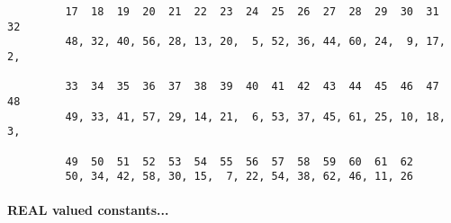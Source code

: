 \begin{itemize}
\begin{minipage}[t]{\textwidth}
\begin{verbatim}
         17  18  19  20  21  22  23  24  25  26  27  28  29  30  31  32
         48, 32, 40, 56, 28, 13, 20,  5, 52, 36, 44, 60, 24,  9, 17,  2,

         33  34  35  36  37  38  39  40  41  42  43  44  45  46  47  48
         49, 33, 41, 57, 29, 14, 21,  6, 53, 37, 45, 61, 25, 10, 18,  3,

         49  50  51  52  53  54  55  56  57  58  59  60  61  62
         50, 34, 42, 58, 30, 15,  7, 22, 54, 38, 62, 46, 11, 26
\end{verbatim}
\normalsize
\end{minipage}
\end{itemize}

\paragraph{REAL valued constants...}
